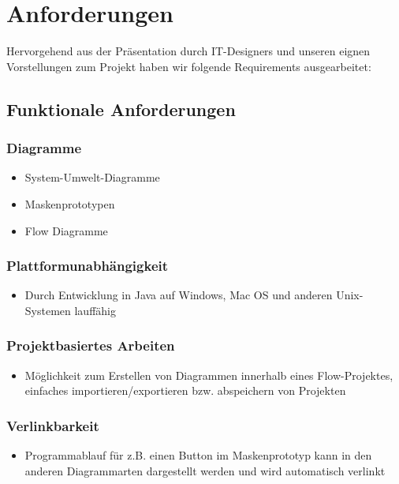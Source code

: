 \section{Anforderungen}
Hervorgehend aus der Präsentation durch IT-Designers und unseren eignen Vorstellungen zum Projekt haben wir folgende Requirements ausgearbeitet:

\subsection{Funktionale Anforderungen}

\subsubsection{Diagramme}
\begin{itemize}
	\item System-Umwelt-Diagramme
	\item Maskenprototypen
	\item Flow Diagramme
\end{itemize}

\subsubsection{Plattformunabhängigkeit}
\begin{itemize}
	\item Durch Entwicklung in Java auf Windows, Mac OS und anderen Unix-Systemen lauffähig
\end{itemize}

\subsubsection{Projektbasiertes Arbeiten}
\begin{itemize}
	\item Möglichkeit zum Erstellen von Diagrammen innerhalb eines Flow-Projektes, einfaches importieren/exportieren bzw. abspeichern von Projekten
\end{itemize}

\subsubsection{Verlinkbarkeit}
\begin{itemize}
	\item Programmablauf für z.B. einen Button im Maskenprototyp kann in den anderen Diagrammarten dargestellt werden und wird automatisch verlinkt 
\end{itemize}

